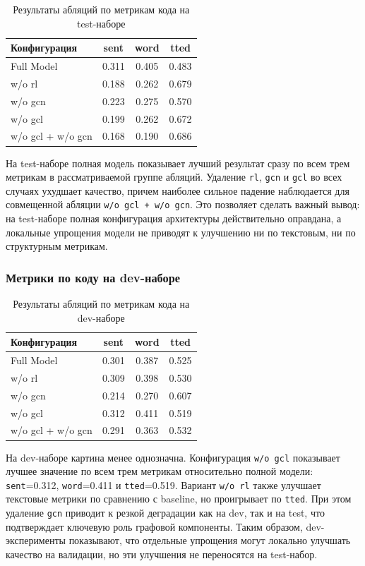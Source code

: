 \documentclass[12pt,a4paper]{article}
\begin{document}
\begin{table}[H]
\centering
\caption{Результаты абляций по метрикам кода на test-наборе}
\begin{tabular}{lccc}
\toprule
Конфигурация & sent & word & tted \\
\midrule
Full Model & 0.311 & 0.405 & 0.483 \\
w/o rl & 0.188 & 0.262 & 0.679 \\
w/o gcn & 0.223 & 0.275 & 0.570 \\
w/o gcl & 0.199 & 0.262 & 0.672 \\
w/o gcl + w/o gcn & 0.168 & 0.190 & 0.686 \\
\bottomrule
\end{tabular}
\end{table}

На test-наборе полная модель показывает лучший результат сразу по всем трем метрикам
в рассматриваемой группе абляций. Удаление \texttt{rl}, \texttt{gcn} и \texttt{gcl}
во всех случаях ухудшает качество, причем наиболее сильное падение наблюдается для
совмещенной абляции \texttt{w/o gcl + w/o gcn}. Это позволяет сделать важный вывод:
на test-наборе полная конфигурация архитектуры действительно оправдана, а локальные
упрощения модели не приводят к улучшению ни по текстовым, ни по структурным метрикам.

\subsubsection{Метрики по коду на dev-наборе}

\begin{table}[H]
\centering
\caption{Результаты абляций по метрикам кода на dev-наборе}
\begin{tabular}{lccc}
\toprule
Конфигурация & sent & word & tted \\
\midrule
Full Model & 0.301 & 0.387 & 0.525 \\
w/o rl & 0.309 & 0.398 & 0.530 \\
w/o gcn & 0.214 & 0.270 & 0.607 \\
w/o gcl & 0.312 & 0.411 & 0.519 \\
w/o gcl + w/o gcn & 0.291 & 0.363 & 0.532 \\
\bottomrule
\end{tabular}
\end{table}

На dev-наборе картина менее однозначна. Конфигурация \texttt{w/o gcl} показывает
лучшее значение по всем трем метрикам относительно полной модели: \texttt{sent}=0.312,
\texttt{word}=0.411 и \texttt{tted}=0.519. Вариант \texttt{w/o rl} также улучшает
текстовые метрики по сравнению с baseline, но проигрывает по \texttt{tted}. При этом
удаление \texttt{gcn} приводит к резкой деградации как на dev, так и на test, что
подтверждает ключевую роль графовой компоненты. Таким образом, dev-эксперименты
показывают, что отдельные упрощения могут локально улучшать качество на валидации,
но эти улучшения не переносятся на test-набор.
\end{document}
